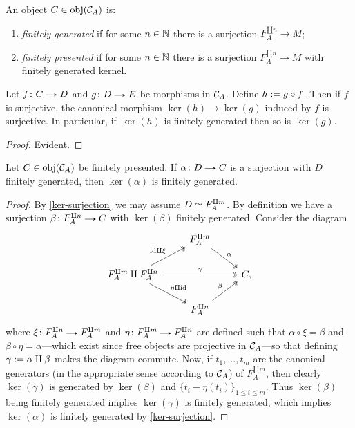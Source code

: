 \begin{definition}
  An object $C \in \operatorname{obj}(\mathcal{C}_A)$ is:
  \begin{enumerate}
  \item \emph{finitely generated} if for some $n \in \mathbb{N}$ there is a
    surjection $F_A^{\amalg n} \to M$;
  \item \emph{finitely presented} if for some $n \in \mathbb{N}$ there is a
    surjection $F_A^{\amalg n} \to M$ with finitely generated kernel.
  \end{enumerate}
\end{definition}

\begin{lemma}
  \label{ker-surjection}
  Let $f \c C \to D$ and $g \c D \to E$ be morphisms in $\mathcal{C}_A$.
  Define $h \mathrel{:=} g \circ f$. Then if $f$ is surjective, the canonical
  morphism $\ker(h) \to \ker(g)$ induced by $f$ is surjective. In
  particular, if $\ker(h)$ is finitely generated then so is $\ker(g)$.
\end{lemma}

\begin{proof}
  Evident.
\end{proof}

\begin{proposition}
  \label{fp-implies-always-fp} Let $C \in \operatorname{obj}(\mathcal{C}_A)$ be finitely
  presented. If $\alpha \c D \to C$ is a surjection with $D$ finitely
  generated, then $\ker(\alpha)$ is finitely generated.
\end{proposition}

\begin{proof}
  By \eqref{ker-surjection} we may assume $D \simeq F_A^{\amalg m}$. By
  definition we have a surjection $\beta \c F_A^{\amalg n} \to C$ with
  $\ker(\beta)$ finitely generated. Consider the diagram
  \[
  \begin{tikzcd}
    & F_A^{\amalg m} \ar[dr, twoheadrightarrow, "\alpha"] & \\
    F_A^{\amalg m} \amalg F_A^{\amalg n}
    \ar[ur, twoheadrightarrow, "\id \amalg \xi"]
    \ar[dr, twoheadrightarrow, "\eta \amalg \id"]
    \ar[rr, twoheadrightarrow, "\gamma"] & & C, \\
    & F_A^{\amalg n} \ar[ur, twoheadrightarrow, "\beta"] &
  \end{tikzcd}
  \]
  where $\xi \c F_A^{\amalg n} \to F_A^{\amalg m}$ and
  $\eta \c F_A^{\amalg m} \to F_A^{\amalg n}$ are defined such that
  $\alpha \circ \xi = \beta$ and $\beta \circ \eta = \alpha$---which
  exist since free objects are projective in $\mathcal{C}_A$---so that defining
  $\gamma \mathrel{:=} \alpha \amalg \beta$ makes the diagram commute. Now, if
  $t_1,\ldots,t_m$ are the canonical generators (in the appropriate
  sense according to $\mathcal{C}_A$) of $F_A^{\amalg m}$, then clearly
  $\ker(\gamma)$ is generated by $\ker(\beta)$ and
  $\{t_i - \eta(t_i)\}_{1 \le i \le m}$. Thus $\ker(\beta)$ being
  finitely generated implies $\ker(\gamma)$ is finitely generated,
  which implies $\ker(\alpha)$ is finitely generated by
  \eqref{ker-surjection}.
\end{proof}

